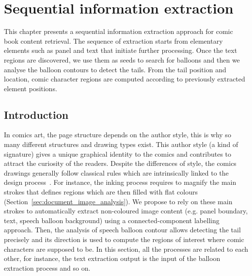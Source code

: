 \chapter{Sequential information extraction}%
\label{chap:sequential}
\graphicspath{{./chapters/3-sequential/figs/}}

This chapter presents a sequential information extraction approach for comic book content retrieval.
The sequence of extraction starts from elementary elements such as panel and text that initiate further processing.
Once the text regions are discovered, we use them as seeds to search for balloons and then we analyse the balloon contours to detect the tails.
From the tail position and location, comic character regions are computed according to previously extracted element positions.


\section{Introduction} %
\label{sec:introduction}

In comics art, the page structure depends on the author style, this is why so many different structures and drawing types exist.
This author style (a kind of signature) gives a unique graphical identity to the comics and contributes to attract the curiosity of the readers.
Despite the differences of style, the comics drawings generally follow classical rules which are intrinsically linked to the design process~\cite{mccloud2006Making}.
For instance, the inking process requires to magnify the main strokes that defines regions which are then filled with flat colours (Section~\ref{sec:document_image_analysis}).
We propose to rely on these main strokes to automatically extract non-coloured image content (e.g. panel boundary, text, speech balloon background) using a connected-component labelling approach.
Then, the analysis of speech balloon contour allows detecting the tail precisely and its direction is used to compute the regions of interest where comic characters are supposed to be.
In this section, all the processes are related to each other, for instance, the text extraction output is the input of the balloon extraction process and so on.

